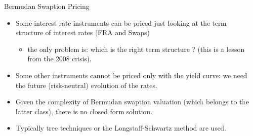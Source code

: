\documentclass{beamer}
\begin{document}

\begin{frame}{Bermudan Swaption Pricing}
\begin{itemize}
	\item<1-> Some interest rate instruments can be priced just looking at the term structure of interest rates (FRA and Swaps)
	\begin{itemize}
		\item the only problem is: which is the right term structure ? (this is a lesson from the 2008 crisis).
	\end{itemize}
	\item<2-> Some other instruments cannot be priced only with the yield curve: we need the future (risk-neutral) evolution of the rates.
	\item<3-> Given the complexity of Bermudan swaption valuation (which belongs to the latter class), there is no closed form solution.		
	\item<4-> Typically tree techniques or the Longstaff-Schwartz method are used.
\end{itemize}
\end{frame}
\end{document}
